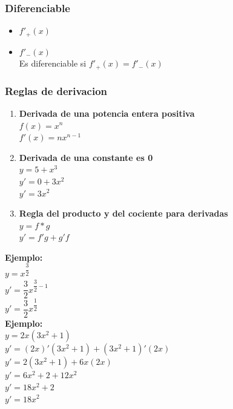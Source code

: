 \documentclass[stu, 12pt, a4paper, donotrepeattitle, floatsintext, natbib]{apa7}
\begin{document}
    \subsubsection{Diferenciable}
    \begin{itemize}
        \item $f'_+(x)$\\[0.5cm]
        \item $f'_-(x)$\\[0.5cm]
        Es diferenciable si $f'_+(x)=f'_-(x)$\\[0.5cm]
    \end{itemize}

    \newpage

    \subsubsection{Reglas de derivacion}
    \begin{paracol}{2}
        \begin{enumerate}
            \item \textbf{Derivada de una potencia entera positiva}\\[0.5cm]
            $f(x)=x^n$\\[0.5cm]
            $f'(x)=nx^{n-1}$\\[0.5cm]
            \vspace{2cm}
            \item \textbf{Derivada de una constante es 0}\\[0.5cm]
            $y=5+x^3$\\[0.5cm]
            $y'=0+3x^2$\\[0.5cm]
            $y'=3x^2$\\[0.5cm]
            \item \textbf{Regla del producto y del cociente para derivadas}\\[0.5cm]
            $y=f*g$\\[0.5cm]
            $y'=f'g+g'f$\\[0.5cm]
        \end{enumerate}
        \switchcolumn
        \textbf{Ejemplo:}\\[0.5cm]
        $y=x^\dfrac{3}{2}$\\[0.5cm]
        $y'=\dfrac{3}{2}x^{\dfrac{3}{2}-1}$\\[0.5cm]
        $y'=\dfrac{3}{2}x^{\dfrac{1}{2}}$\\[0.5cm]

        \vspace{6.5cm}
        \textbf{Ejemplo:}\\[0.5cm]
        $y=2x(3x^2+1)$\\[0.5cm]
        $y'=(2x)'(3x^2+1)+(3x^2+1)'(2x)$\\[0.5cm]
        $y'=2(3x^2+1)+6x(2x)$\\[0.5cm]
        $y'=6x^2+2+12x^2$\\[0.5cm]
        $y'=18x^2+2$\\[0.5cm]
        $y'=18x^2$\\[0.5cm]
    \end{paracol}
    \newpage
\end{document}
